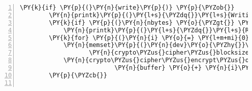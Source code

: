 \begin{Verbatim}[commandchars=\\\{\},numbers=left,firstnumber=1,stepnumber=1]
	\PY{k}{if} \PY{p}{(}\PY{n}{write}\PY{p}{)} \PY{p}{\PYZob{}}
		\PY{n}{printk}\PY{p}{(}\PY{l+s}{\PYZdq{}}\PY{l+s}{Writing to memdiskblk \PYZhy{}\PYZhy{} }\PY{l+s+se}{\PYZbs{}n}\PY{l+s}{\PYZdq{}}\PY{p}{)}\PY{p}{;}
		\PY{k}{if} \PY{p}{(}\PY{n}{nbytes} \PY{o}{\PYZgt{}} \PY{l+m+mi}{3}\PY{p}{)}
			\PY{n}{printk}\PY{p}{(}\PY{l+s}{\PYZdq{}}\PY{l+s}{Raw data: \PYZpc{}x\PYZpc{}x\PYZpc{}x}\PY{l+s+se}{\PYZbs{}n}\PY{l+s}{\PYZdq{}}\PY{p}{,} \PY{p}{(}\PY{n}{buffer}\PY{p}{)}\PY{p}{[}\PY{l+m+mi}{0}\PY{p}{]}\PY{p}{,} \PY{p}{(}\PY{n}{buffer}\PY{p}{)}\PY{p}{[}\PY{l+m+mi}{1}\PY{p}{]}\PY{p}{,} \PY{p}{(}\PY{n}{buffer}\PY{p}{)}\PY{p}{[}\PY{l+m+mi}{2}\PY{p}{]}\PY{p}{)}\PY{p}{;}
		\PY{k}{for} \PY{p}{(}\PY{n}{i} \PY{o}{=} \PY{l+m+mi}{0}\PY{p}{;} \PY{n}{i} \PY{o}{\PYZlt{}} \PY{n}{nbytes}\PY{p}{;} \PY{n}{i} \PY{o}{+}\PY{o}{=} \PY{n}{crypto\PYZus{}cipher\PYZus{}blocksize}\PY{p}{(}\PY{n}{tfm}\PY{p}{)}\PY{p}{)} \PY{p}{\PYZob{}}
			\PY{n}{memset}\PY{p}{(}\PY{n}{dev}\PY{o}{\PYZhy{}}\PY{o}{\PYZgt{}}\PY{n}{data} \PY{o}{+} \PY{n}{offset} \PY{o}{+} \PY{n}{i}\PY{p}{,} \PY{l+m+mi}{0}\PY{p}{,}
				   \PY{n}{crypto\PYZus{}cipher\PYZus{}blocksize}\PY{p}{(}\PY{n}{tfm}\PY{p}{)}\PY{p}{)}\PY{p}{;}
			\PY{n}{crypto\PYZus{}cipher\PYZus{}encrypt\PYZus{}one}\PY{p}{(}\PY{n}{tfm}\PY{p}{,} \PY{n}{dev}\PY{o}{\PYZhy{}}\PY{o}{\PYZgt{}}\PY{n}{data} \PY{o}{+} \PY{n}{offset} \PY{o}{+} \PY{n}{i}\PY{p}{,}
						  \PY{n}{buffer} \PY{o}{+} \PY{n}{i}\PY{p}{)}\PY{p}{;}
		\PY{p}{\PYZcb{}}


\end{Verbatim}
